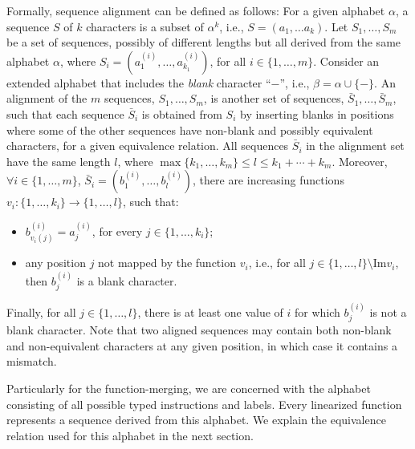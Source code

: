Formally, sequence alignment can be defined as follows:
For a given alphabet $\alpha$, a sequence $S$ of $k$ characters is a subset of
$\alpha^k$, i.e., $S = (a_1, \ldots a_k)$.
Let $S_1, \ldots, S_m$ be a set of sequences, possibly of different lengths but
all derived from the same alphabet $\alpha$, where
$S_i = (a_1^{(i)}, \ldots, a_{k_1}^{(i)})$, for all $i\in\{1,\ldots,m\}$.
Consider an extended alphabet that includes the \textit{blank} character ``$-$'',
i.e., $\beta = \alpha \cup \{-\}$.
An alignment of the $m$ sequences, $S_1, \ldots, S_m$, is another set of sequences,
$\bar{S}_1, \ldots, \bar{S}_m$, such that each sequence $\bar{S}_i$ is obtained
from $S_i$ by inserting blanks in positions where some of the other sequences
have non-blank and possibly equivalent characters, for a given equivalence relation.
All sequences $\bar{S}_i$ in the alignment set have the same length $l$, where
$\max\{k_1,\ldots,k_m\} \leq l \leq k_1 + \cdots + k_m$.
Moreover, $\forall i\in\{1,\ldots, m\}$, $\bar{S}_i = (b_1^{(i)},\ldots,b_l^{(i)})$,
there are increasing functions $v_i: \{1,\ldots,k_i\} \to \{1,\ldots,l\}$, such that:
\begin{itemize}[noitemsep,topsep=0pt]
\item $b_{v_i(j)}^{(i)} = a_j^{(i)}$, for every $j \in \{1,\ldots,k_i\}$;
\item any position $j$ not mapped by the function $v_i$, i.e.,
for all $j \in \{1,\ldots,l\}\setminus \textrm{Im} v_i$,
then $b_j^{(i)}$ is a blank character.
\end{itemize}
Finally, for all $j\in\{1,\ldots,l\}$, there is at least one value of $i$ for
which $b_j^{(i)}$ is not a blank character.
Note that two aligned sequences may contain both non-blank and non-equivalent
characters at any given position, in which case it contains a mismatch.

Particularly for the function-merging, we are concerned with the alphabet
consisting of all possible typed instructions and labels.
Every linearized function represents a sequence derived from this alphabet.
We explain the equivalence relation used for this alphabet in the next section.

